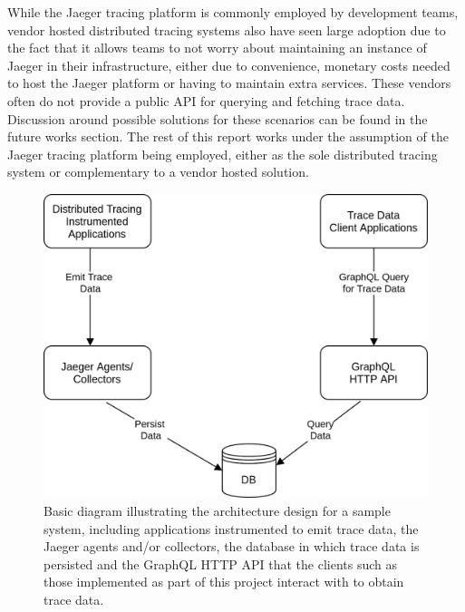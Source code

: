 \documentclass[12pt,pdftex,titlepage]{report}
\begin{document}
                    While the Jaeger tracing platform is commonly employed by development teams, vendor hosted distributed tracing systems also have seen large adoption due to the 
                    fact that it allows teams to not worry about maintaining an instance of Jaeger in their infrastructure, either due to convenience, monetary costs needed to host
                    the Jaeger platform or having to maintain extra services. These vendors often do not provide a public API for querying and fetching trace data. Discussion around
                    possible solutions for these scenarios can be found in the future works section. The rest of this report works under the assumption of the Jaeger tracing platform
                    being employed, either as the sole distributed tracing system or complementary to a vendor hosted solution. 

                \bigskip
                \begin{figure}[hbt!]
                    \centering
                    \includegraphics[scale=0.2]{arch.png}
                    \caption{Basic diagram illustrating the architecture design for a sample system, including applications instrumented to emit trace data, the Jaeger agents and/or collectors,
                    the database in which trace data is persisted and the GraphQL HTTP API that the clients such as those implemented as part of this project interact with to obtain trace data.}
                    \label{fig:arch}
                \end{figure}
\end{document}
